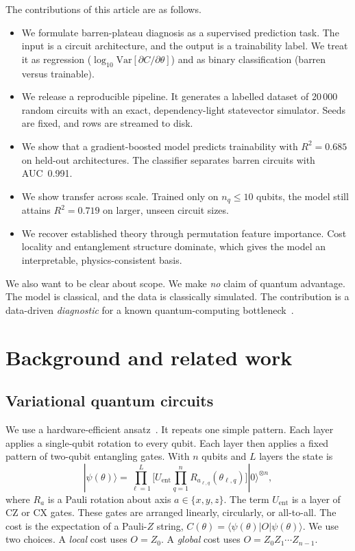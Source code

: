 \documentclass[12pt]{iopart}
\newcommand{\Nrows}{20\,000}
\newcommand{\RsqHold}{0.685}
\newcommand{\AucHold}{0.991}
\newcommand{\ExtrapCut}{10}
\newcommand{\RsqExtrap}{0.719}
\begin{document}
The contributions of this article are as follows.
\begin{itemize}
\item We formulate barren-plateau diagnosis as a supervised prediction task. The
input is a circuit architecture, and the output is a trainability label. We treat
it as regression ($\log_{10}\mathrm{Var}[\partial C/\partial\theta]$) and as
binary classification (barren versus trainable).
\item We release a reproducible pipeline. It generates a labelled dataset of
\Nrows{} random circuits with an exact, dependency-light statevector simulator.
Seeds are fixed, and rows are streamed to disk.
\item We show that a gradient-boosted model predicts trainability with
$R^2=\RsqHold{}$ on held-out architectures. The classifier separates barren
circuits with AUC~\AucHold{}.
\item We show transfer across scale. Trained only on $n_q\le\ExtrapCut{}$ qubits,
the model still attains $R^2=\RsqExtrap{}$ on larger, unseen circuit sizes.
\item We recover established theory through permutation feature importance. Cost
locality and entanglement structure dominate, which gives the model an
interpretable, physics-consistent basis.
\end{itemize}

We also want to be clear about scope. We make \emph{no} claim of quantum
advantage. The model is classical, and the data is classically simulated. The
contribution is a data-driven \emph{diagnostic} for a known quantum-computing
bottleneck~\cite{schuld2022killoran,bowles2024benchmarking}.

\section{Background and related work}

\subsection{Variational quantum circuits}
We use a hardware-efficient ansatz~\cite{kandala2017hardware}. It repeats one
simple pattern. Each layer applies a single-qubit rotation to every qubit. Each
layer then applies a fixed pattern of two-qubit entangling gates. With $n$ qubits
and $L$ layers the state is
\begin{equation}
|\psi(\theta)\rangle = \prod_{\ell=1}^{L}
  \Big[ U_{\mathrm{ent}} \prod_{q=1}^{n} R_{a_{\ell,q}}(\theta_{\ell,q}) \Big]
  |0\rangle^{\otimes n},
\end{equation}
where $R_a$ is a Pauli rotation about axis $a\in\{x,y,z\}$. The term
$U_{\mathrm{ent}}$ is a layer of CZ or CX gates. These gates are arranged
linearly, circularly, or all-to-all. The cost is the expectation of a Pauli-$Z$
string, $C(\theta)=\langle\psi(\theta)|O|\psi(\theta)\rangle$. We use two
choices. A \emph{local} cost uses $O=Z_0$. A \emph{global} cost uses
$O=Z_0Z_1\cdots Z_{n-1}$.
\end{document}
